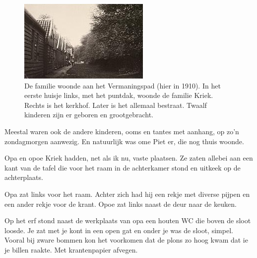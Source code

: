 \documentclass[12pt,twoside, openright]{memoir}
\begin{document}
\begin{figure}
\centering
\includegraphics[width=\textwidth]{img/ch3/Vermaningspad1910}
\caption*{\footnotesize De familie woonde aan het Vermaningspad (hier in 1910). In het eerste huisje links, met het puntdak, woonde de familie Kriek. Rechts is het kerkhof. Later is het allemaal bestraat. Twaalf kinderen zijn er geboren en grootgebracht.}
\end{figure}

Meestal waren ook de andere kinderen, ooms en tantes met aanhang, op zo’n zondagmorgen aanwezig. En natuurlijk was ome Piet er, die nog thuis woonde. 

Opa en opoe Kriek hadden, net als ik nu, vaste plaatsen. Ze zaten allebei aan een kant van de tafel die voor het raam in de achterkamer stond en uitkeek op de achterplaats. 

Opa zat links voor het raam. Achter zich had hij een rekje met diverse pijpen en een ander rekje voor de krant. Opoe zat links naast de deur naar de keuken.

Op het erf stond naast de werkplaats van opa een houten WC die boven de sloot loosde. Je zat met je kont in een open gat en onder je was de sloot, simpel. Vooral bij zware bommen kon het voorkomen dat de plons zo hoog kwam dat ie je billen raakte. Met krantenpapier afvegen.
\end{document}
